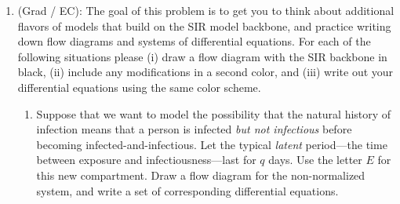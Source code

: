 \documentclass[11pt]{article}
\begin{document}
\begin{enumerate}
\begin{enumerate}[label=\alph*.]
\end{enumerate}

\clearpage
\item (Grad / EC): The goal of this problem is to get you to think about additional flavors of models that build on the SIR model backbone, and practice writing down flow diagrams and systems of differential equations. For each of the following situations please (i) draw a flow diagram with the SIR backbone in black, (ii) include any modifications in a second color, and (iii) write out your differential equations using the same color scheme. 
\begin{enumerate}
	\item Suppose that we want to model the possibility that the natural history of infection means that a person is infected {\it but not infectious} before becoming infected-and-infectious. Let the typical {\it latent} period---the time between exposure and infectiousness---last for $q$ days. Use the letter $E$ for this new compartment. Draw a flow diagram for the non-normalized system, and write a set of corresponding differential equations. 
	

\end{enumerate}
\end{enumerate}
\end{document}
